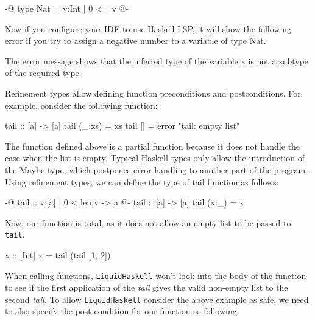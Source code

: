 \documentclass[]{rptuseminar}
\begin{document}
\begin{haskell}
 {-@ type Nat = {v:Int | 0 <= v} @-}
\end{haskell}

Now if you configure your IDE to use Haskell LSP, it will show the following error if you try to assign a negative number
to a variable of type Nat.


The error message shows that the inferred type of the variable x is not a subtype of the required type.

Refinement types allow defining function preconditions and postconditions\cite{jhala_programming_2020}. 
For example, consider the following function:

\begin{haskell}
 tail :: [a] -> [a]
 tail (_:xs) = xs
 tail [] = error "tail: empty list"
\end{haskell}

The function defined above is a partial function because it does not handle the case when the list is empty. 
 Typical Haskell types only allow the introduction of the Maybe type, which postpones error 
 handling to another part of the program \cite{jhala_programming_2020}. Using refinement types, we can define the type of tail function as follows:

\begin{haskell}
 {-@ tail :: {v:[a] | 0 < len v} -> a @-}
 tail :: [a] -> [a]
 tail (x:_) = x
\end{haskell}

Now, our function is total, as it does not allow an empty list to be passed to \texttt{tail}.

\begin{haskell}
 x :: [Int]
 x = tail (tail [1, 2])
\end{haskell}

When calling functions, \texttt{LiquidHaskell} won't look into the body of the function to see if the first application of the \textit{tail} gives the valid non-empty list to the second \textit{tail}.
To allow \texttt{LiquidHaskell} consider the above example as safe, we need to also specify the post-condition for our function as following:
\end{document}
